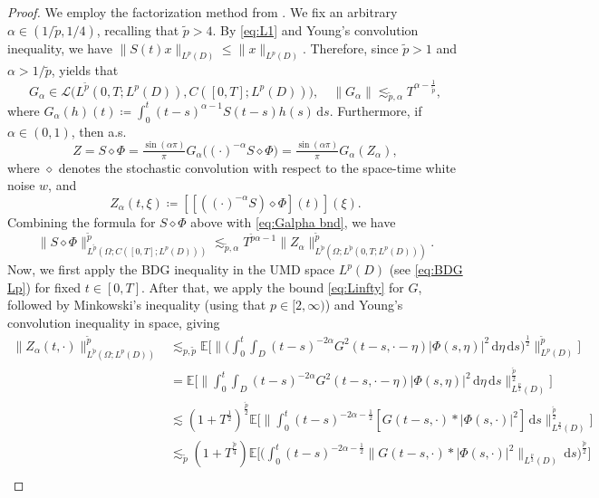 \documentclass{amsart}
\theoremstyle{plain}
\theoremstyle{remark}
\theoremstyle{plain}
\numberwithin{equation}{section}
\newcommand{\ceqq}{\coloneqq}
\newcommand{\E}{{\mathbb E}}
\newcommand{\Om}{\Omega}
\newcommand{\calL}{\mathcal{L}}
\newcommand{\dd}{\,\mathrm{d}}
\begin{document}
\begin{proof}
We employ the factorization method from \cite{daprato}. We fix an arbitrary $\alpha\in(1/\tilde p, 1/4)$, recalling that $\tilde p>4$.  By \eqref{eq:L1} and Young's convolution inequality, we have 
$\|S(t)x\|_{L^p(D)}\leq \|x\|_{L^p(D)}.$  
Therefore, since ${\tilde p}>1$ and $\alpha>{1}/{\tilde p}$,   \cite[Prop.\ 5.9]{daprato}   
yields that 
\begin{equation}\label{eq:Galpha bnd}
G_\alpha\in \calL\big(L^{{\tilde p}}(0,T;L^p(D)),C([0,T];L^p(D))\big),\quad \|G_{\alpha}\|\lesssim_{\tilde p,\alpha}  T^{ \alpha-\frac{1}{\tilde p}},
\end{equation} 
where $G_\alpha(h)(t)\ceqq \int_0^t(t-s)^{\alpha-1}S(t-s)h(s)\dd s$. 
Furthermore, if $\alpha\in(0,1)$, then a.s.
\[
Z=S\diamond \Phi
=\tfrac{\sin(\alpha\pi)}{\pi} G_\alpha\big((\cdot)^{-\alpha}S\diamond \Phi\big)
=\tfrac{\sin(\alpha\pi)}{\pi} G_\alpha(Z_\alpha),
\]
where $\diamond$ denotes the stochastic convolution with respect to the space-time white noise $w$, and 
$$Z_\alpha(t,\xi)\ceqq [[((\cdot)^{-\alpha}S)\diamond \Phi](t)](\xi). $$ 
Combining  the formula for $S\diamond \Phi$ above with \eqref{eq:Galpha bnd}, we have 
\begin{equation}\label{eq:factor est}
\|S\diamond \Phi\|_{L^{\tilde p}(\Om;C([0,T];L^p(D)))}^{\tilde p}\lesssim_{\tilde p,\alpha}    T^{\tilde p \alpha-1}\|Z_\alpha\|_{L^{\tilde p}(\Om;L^{{\tilde p}}(0,T;L^p(D)))}^{\tilde p}. 
\end{equation}
Now, we first apply the BDG inequality  in the UMD space $L^p(D)$ (see \eqref{eq:BDG Lp}) for fixed $t\in[0,T]$. After that, we apply the bound \eqref{eq:Linfty} for $G$, followed by Minkowski's inequality (using that $p\in [2,\infty)$) and Young's convolution inequality in space, giving 
\begin{align*}
    \|Z_\alpha(t,\cdot)\|_{L^{\tilde p}(\Om;L^p(D))}^{\tilde p}
    &\lesssim_{p,\tilde p} \E\bigg[\Big\|\Big(\int_0^t\int_D (t-s)^{-2\alpha}G^2(t-s,\cdot-\eta)|\Phi(s,\eta)|^2\dd\eta\dd s \Big)^{\frac12}\Big\|_{L^p(D)}^{\tilde p} \bigg]\\
&= \E\bigg[\Big\| \int_0^t\int_D (t-s)^{-2\alpha}G^2(t-s,\cdot-\eta)|\Phi(s,\eta)|^2\dd\eta\dd s \Big\|_{L^{\frac{p}{2}}(D)}^{\frac{\tilde p}{2}} \bigg]\\
&\lesssim (1+T^{\frac12})^{\frac{\tilde p}{2}} \E\bigg[\Big\| \int_0^t (t-s)^{-2\alpha-\frac12}[G (t-s,\cdot)*|\Phi(s,\cdot)|^2] \dd s \Big\|_{L^{\frac{p}{2}}(D)}^{\frac{\tilde p}{2}} \bigg]\\
&\lesssim_{\tilde p} (1+T^{\frac{\tilde p}{4}}) \E\bigg[\Big(  \int_0^t (t-s)^{-2\alpha-\frac12}\big\|G (t-s,\cdot)*|\Phi(s,\cdot)|^2\big\|_{L^{\frac{p}{2}}(D)} \dd s \Big)^{\frac{\tilde p}{2}} \bigg]\\

\end{align*}
\end{proof}
\end{document}
